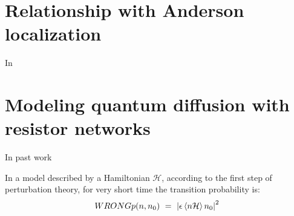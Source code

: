 \section{Relationship with Anderson localization}

In 

\section{Modeling quantum diffusion with resistor networks}

In past work \cite{PRL_2000} 

In a model described by a Hamiltonian $\mathcal{H}$,
according to the first step of perturbation theory,
for very short time the transition probability is:
%
\begin{align}
WRONG p(n, n_0)\ =\ \left| \epsilon \left\langle{n} \mathcal{H}\right\rangle{n_0}\right|^2
\end{align}
%


